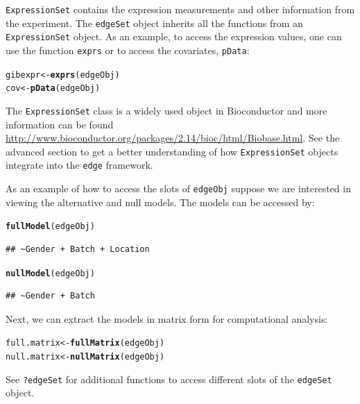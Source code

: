 \documentclass{article}\usepackage[]{graphicx}\usepackage[]{color}
\makeatletter
\newcommand{\hlstd}[1]{\textcolor[rgb]{0.345,0.345,0.345}{#1}}%
\newcommand{\hlkwb}[1]{\textcolor[rgb]{0.69,0.353,0.396}{#1}}%
\newcommand{\hlkwd}[1]{\textcolor[rgb]{0.737,0.353,0.396}{\textbf{#1}}}%
\newenvironment{kframe}{%
 \def\at@end@of@kframe{}%
 \ifinner\ifhmode%
  \def\at@end@of@kframe{\end{minipage}}%
  \begin{minipage}{\columnwidth}%
 \fi\fi%
 \def\FrameCommand##1{\hskip\@totalleftmargin \hskip-\fboxsep
 \colorbox{shadecolor}{##1}\hskip-\fboxsep
     \hskip-\linewidth \hskip-\@totalleftmargin \hskip\columnwidth}%
 \MakeFramed {\advance\hsize-\width
   \@totalleftmargin\z@ \linewidth\hsize
   \@setminipage}}%
 {\par\unskip\endMakeFramed%
 \at@end@of@kframe}
\newenvironment{knitrout}{}{} %
\makeatother
\begin{document}
{\tt ExpressionSet} contains the expression measurements and other information from the experiment. The {\tt edgeSet} object inherits all the functions from an {\tt ExpressionSet} object. As an example, to access the expression values, one can use the function {\tt exprs} or to access the covariates, {\tt pData}:
\begin{knitrout}
\color{fgcolor}\begin{kframe}
\begin{alltt}
\hlstd{gibexpr} \hlkwb{<-} \hlkwd{exprs}\hlstd{(edgeObj)}
\hlstd{cov} \hlkwb{<-} \hlkwd{pData}\hlstd{(edgeObj)}
\end{alltt}
\end{kframe}
\end{knitrout}
The {\tt ExpressionSet} class is a widely used object in Bioconductor and more information can be found \url{http://www.bioconductor.org/packages/2.14/bioc/html/Biobase.html}. See the advanced section to get a better understanding of how {\tt ExpressionSet} objects integrate into the {\tt edge} framework.

As an example of how to access the slots of {\tt edgeObj} suppose we are interested in viewing the alternative and null models. The models can be accessed by:
\begin{knitrout}
\color{fgcolor}\begin{kframe}
\begin{alltt}
\hlkwd{fullModel}\hlstd{(edgeObj)}
\end{alltt}
\begin{verbatim}
## ~Gender + Batch + Location
\end{verbatim}
\begin{alltt}
\hlkwd{nullModel}\hlstd{(edgeObj)}
\end{alltt}
\begin{verbatim}
## ~Gender + Batch
\end{verbatim}
\end{kframe}
\end{knitrout}
Next, we can extract the models in matrix form for computational analysis:
\begin{knitrout}
\color{fgcolor}\begin{kframe}
\begin{alltt}
\hlstd{full.matrix} \hlkwb{<-} \hlkwd{fullMatrix}\hlstd{(edgeObj)}
\hlstd{null.matrix} \hlkwb{<-} \hlkwd{nullMatrix}\hlstd{(edgeObj)}
\end{alltt}
\end{kframe}
\end{knitrout}
See {\tt ?edgeSet} for additional functions to access different slots of the {\tt edgeSet} object. 
\end{document}
